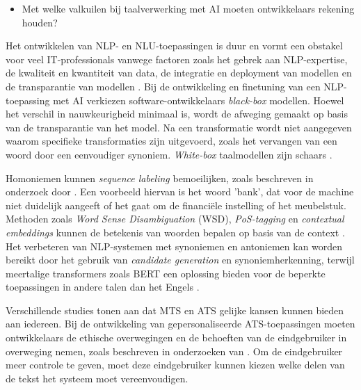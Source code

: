 \begin{itemize}
	\item Met welke valkuilen bij taalverwerking met AI moeten ontwikkelaars rekening houden?
\end{itemize}

\medspace

Het ontwikkelen van NLP- en NLU-toepassingen is duur en vormt een obstakel voor veel IT-professionals vanwege factoren zoals het gebrek aan NLP-expertise, de kwaliteit en kwantiteit van data, de integratie en deployment van modellen en de transparantie van modellen \autocite{IBM2022}. Bij de ontwikkeling en finetuning van een NLP-toepassing met AI verkiezen software-ontwikkelaars \textit{black-box} modellen. Hoewel het verschil in nauwkeurigheid minimaal is, wordt de afweging gemaakt op basis van de transparantie van het model. Na een transformatie wordt niet aangegeven waarom specifieke transformaties zijn uitgevoerd, zoals het vervangen van een woord door een eenvoudiger synoniem. \textit{White-box} taalmodellen zijn schaars \autocite{Punardeep2020}.

\medspace 

Homoniemen kunnen \textit{sequence labeling} bemoeilijken, zoals beschreven in onderzoek door \textcite{Roldos2020}. Een voorbeeld hiervan is het woord 'bank', dat voor de machine niet duidelijk aangeeft of het gaat om de financiële instelling of het meubelstuk. Methoden zoals \textit{Word Sense Disambiguation} (WSD), \textit{PoS-tagging} en \textit{contextual embeddings} kunnen de betekenis van woorden bepalen op basis van de context \autocite{Eisenstein2019, Liu2020}. Het verbeteren van NLP-systemen met synoniemen en antoniemen kan worden bereikt door het gebruik van \textit{candidate generation} en synoniemherkenning, terwijl meertalige transformers zoals BERT een oplossing bieden voor de beperkte toepassingen in andere talen dan het Engels \autocite{Dandekar2016, Roldos2020}.

\medspace

Verschillende studies tonen aan dat MTS en ATS gelijke kansen kunnen bieden aan iedereen. Bij de ontwikkeling van gepersonaliseerde ATS-toepassingen moeten ontwikkelaars de ethische overwegingen en de behoeften van de eindgebruiker in overweging nemen, zoals beschreven in onderzoeken van \textcite{Niemeijer2010, Xu2015, Gooding2022}. Om de eindgebruiker meer controle te geven, moet deze eindgebruiker kunnen kiezen welke delen van de tekst het systeem moet vereenvoudigen.

\medspace

